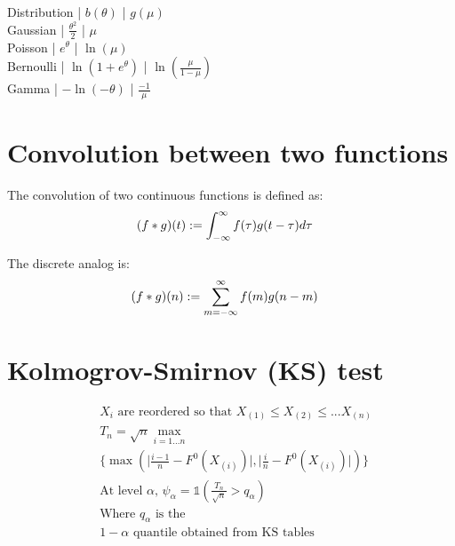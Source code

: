  Distribution | $b(\theta)$ | $g(\mu)$ \\
 Gaussian | $ \frac {\theta^2} {2}$ | $ \mu $ \\
 Poisson | $ e^{\theta} $ | $ \ln(\mu) $ \\
 Bernoulli | $ \ln (1 + e^{\theta}) $ | $ \ln (\frac {\mu} {1 - \mu}) $ \\
 Gamma | $ -\ln (-\theta) $ | $ \frac {-1} {\mu} $ \\

\section {Convolution between two functions} 
The convolution of two continuous functions is defined as:
\begin{equation} \begin {split}
& ({f * g}) (t) := \int_{- \infty}^{\infty} f(\tau) g(t - \tau) d\tau
\end {split} \end{equation} 

The discrete analog is:
\begin{equation} \begin {split}
& ({f * g}) (n) := \sum_{m = -\infty}^{\infty} f(m) g(n - m)
\end {split} \end{equation}

\section {Kolmogrov-Smirnov (KS) test}
\begin {equation} 
\begin {split}
& \text {$X_i$ are reordered so that } X_{(1)} \le X_{(2)} \le ... X_{(n)} \\
& T_n = \sqrt{n} \max \limits_{i=1...n} \\
& \{ \max (\lvert \frac {i-1}{n} - F^0(X_{(i)}) \rvert , \lvert \frac {i}{n} - F^0(X_{(i)}) \rvert ) \} \\
& \text {At level $\alpha$, } \psi_{\alpha}  = \mathds{1} (\frac {T_n}{\sqrt{n}} > q_{\alpha}) \\
& \text {Where $q_{\alpha}$ is the} \\
& \text {$1 - \alpha$ quantile obtained from KS tables} \\
\end {split}
\end {equation}

